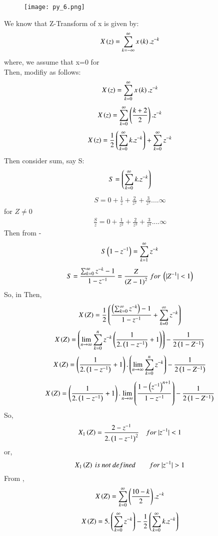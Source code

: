 \documentclass[beamer]{IEEEtran}
\theoremstyle{remark}
\begin{document}
\begin{figure}[h]
    \centering
    \texttt{[image: py\_6.png]}
    \label{fig:enter-label}
\end{figure}
We know that Z-Transform of x is given by:
\begin{align}
\label{q11}
    X\left(z\right)=\sum_{k=-\infty}^{\infty} x\left(k\right).z^{-k}
\end{align}
where, we assume that x=0   for \\
Then, \brak{\ref{q11}} modifiy as follows:
\begin{align}
\label{q12}
    X\left(z\right)=\sum_{k=0}^{\infty} x\left(k\right).z^{-k}
\end{align}
$$X\left(z\right)=\sum_{k=0}^{\infty} \left(\frac{k+2}{2}\right).z^{-k}$$
\begin{align}
    \label{q13}
    X\left(z\right)=\frac{1}{2}\left(\sum_{k=0}^{\infty}k.z^{-k}\right)+\sum_{k=0}^{\infty}z^{-k}
\end{align}
Then consider sum, say S:
$$S=\left(\sum_{k=0}^{\infty}k.z^{-k}\right)$$
\begin{align}
\label{q14}
S=0+\frac{1}{z}+\frac{2}{z^2}+\frac{3}{z^3}....\infty
\end{align}
for $Z\neq 0$
\begin{align}
\label{q15}
\frac{S}{z}=0+\frac{1}{z^2}+\frac{2}{z^3}+\frac{3}{z^4}....\infty
\end{align}
Then from \brak{\ref{q15}}-\brak{\ref{q11}}
$$S\left(1-z^{-1}\right)=\sum_{k=1}^{\infty}z^{-k}$$
\begin{align}
\label{q16}
    S=\frac{\sum_{k=0}^{\infty}z^{-k}-1}{1-z^{-1}}=\frac{Z}{\brak{Z-1}^2}\ for\ \brak{|Z^{-1}|<1}
\end{align}
So,\brak{\ref{q16}} in \brak{\ref{q13}} Then,
$$X\left(Z\right)=\frac{1}{2}\left(\frac{\left(\sum_{k=0}^{\infty}z^{-k}\right)-1}{1-z^{-1}}+\sum_{k=0}^{\infty}z^{-k}\right)$$
$$X\left(Z\right)=\left(\lim_{n\to\infty}\sum_{k=0}^{n}z^{-k}\left(\frac{1}{2.\left(1-z^{-1}\right)}+1\right)\right)-\frac{1}{2\left(1-Z^{-1}\right)}$$
$$X\left(Z\right)=\left(\frac{1}{2.\left(1-z^{-1}\right)}+1\right).\left(\lim_{n\to\infty}\sum_{k=0}^{n}z^{-k}\right)-\frac{1}{2\left(1-Z^{-1}\right)}$$
$$X\left(Z\right)=\left(\frac{1}{2.\left(1-z^{-1}\right)}+1\right).\lim_{n\to\infty}\left(\frac{1-\left(z^{-1}\right)^{n+1}}{1-z^{-1}}\right)-\frac{1}{2\left(1-Z^{-1}\right)}$$
So,
$$ X_1\left(Z\right)=\frac{2-z^{-1}}{2.\left(1-z^{-1}\right)^2}\quad for\ |z^{-1}|<1$$
or,
$$X_1\brak{Z}\ is\ not\ defined\qquad for\ |z^{-1}|>1 $$
From \brak{\ref{q12}},
$$X\left(Z\right)=\sum_{k=0}^{\infty} \left(\frac{10-k}{2}\right).z^{-k}$$
$$X\left(Z\right)=5.\left(\sum_{k=0}^{\infty}z^{-k}\right)-\frac{1}{2}\left(\sum_{k=0}^{\infty}k.z^{-k}\right)$$
\end{document}
